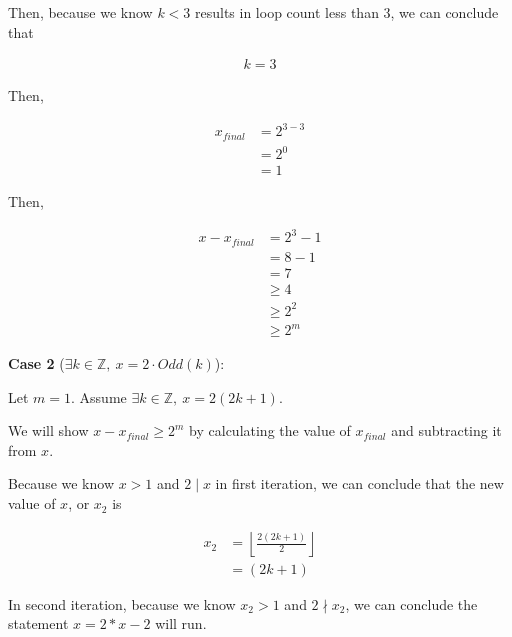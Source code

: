 \documentclass[12pt]{article}
\begin{document}
\begin{enumerate}[a.]
    \bigskip

    Then, because we know $k < 3$ results in loop count less than 3, we can conclude
    that

    \begin{align}
        k = 3
    \end{align}

    \bigskip

    Then,

    \begin{align}
        x_{final} &= 2^{3-3}\\
        &= 2^0\\
        &= 1
    \end{align}

    \bigskip

    Then,

    \bigskip

    \begin{align}
        x - x_{final} &= 2^3 - 1\\
        &= 8 - 1\\
        &= 7\\
        &\geq 4\\
        &\geq 2^2\\
        &\geq 2^m
    \end{align}

    \bigskip

    \textbf{Case 2} ($\exists k \in \mathbb{Z},\:x = 2 \cdot Odd(k)$):

    \bigskip

    Let $m = 1$. Assume $\exists k \in \mathbb{Z},\:x = 2(2k+1)$.

    \bigskip

    We will show $x - x_{final} \geq 2^m$ by calculating the value of $x_{final}$
    and subtracting it from $x$.

    \bigskip

    Because we know $x > 1$ and $2 \mid x$ in first iteration, we can conclude
    that the new value of $x$, or $x_2$ is

    \begin{align}
        x_2 &= \left\lfloor \frac{2(2k+1)}{2} \right\rfloor\\
        &= (2k + 1)
    \end{align}

    \bigskip

    In second iteration, because we know $x_2 > 1$ and $2 \nmid x_2$,
    we can conclude the statement $x = 2 * x - 2$ will run.


\end{enumerate}
\end{document}
